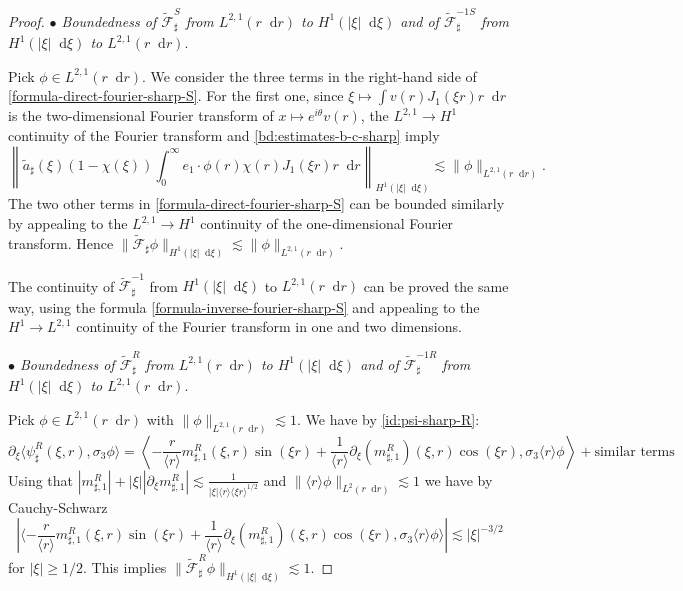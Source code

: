 \documentclass[11 pt]{amsart}
\theoremstyle{definition}
\theoremstyle{remark}
\numberwithin{equation}{section}
\newcommand{\dd}{\mathop{}\!\mathrm{d}}
\begin{document}
\begin{proof}
\smallskip


\noindent \textit{$\bullet$ Boundedness of $\widetilde{\mathcal F}_\sharp^S$ from $L^{2,1}(r\dd r)$ to $H^1(|\xi|\dd \xi)$ and of $\widetilde{\mathcal F}^{-1S}_\sharp$ from $H^1(|\xi|\dd \xi)$ to $L^{2,1}(r\dd r)$}.

Pick $\phi\in L^{2,1}(r\dd r)$. We consider the three terms in the right-hand side of \eqref{formula-direct-fourier-sharp-S}. For the first one, since $\xi \mapsto \int v(r)J_1(\xi r) r\dd r$ is the two-dimensional Fourier transform of $x\mapsto e^{i\theta}v(r)$, the $L^{2,1}\rightarrow H^1$ continuity of the Fourier transform and \eqref{bd:estimates-b-c-sharp} imply 
$$
\left\| \widetilde a_\sharp (\xi) (1- \chi(\xi)) \int_0^\infty e_1 \cdot \phi(r)\chi (r)  J_1(\xi r) r\dd r \right\|_{H^1(|\xi|\dd \xi)}\lesssim \| \phi \|_{L^{2,1}(r\dd r)}.
$$
The two other terms in \eqref{formula-direct-fourier-sharp-S} can be bounded similarly by appealing to the $L^{2,1}\rightarrow H^1$ continuity of the one-dimensional Fourier transform. Hence $\| \widetilde{\mathcal F}_\sharp \phi\|_{H^1(|\xi|\dd \xi)}\lesssim \| \phi \|_{L^{2,1}(r\dd r)}$.

The continuity of $\widetilde{\mathcal F}^{-1}_\sharp$ from $H^1(|\xi|\dd \xi)$ to $L^{2,1}(r\dd r)$ can be proved the same way, using the formula \eqref{formula-inverse-fourier-sharp-S} and appealing to the $H^1\to L^{2,1}$ continuity of the Fourier transform in one and two dimensions.

\smallskip \noindent \textit{$\bullet$ Boundedness of $\widetilde{\mathcal F}_\sharp^R$ from $L^{2,1}(r\dd r)$ to $H^1(|\xi|\dd \xi)$ and of $\widetilde{\mathcal F}^{-1R}_\sharp$ from $H^1(|\xi|\dd \xi)$ to $L^{2,1}(r\dd r)$}.

Pick $\phi\in L^{2,1}(r\dd r)$ with $\| \phi\|_{L^{2,1}(r\dd r)}\lesssim 1$. We have by \eqref{id:psi-sharp-R}:
$$
\partial_\xi \langle \psi^R_\sharp (\xi,r),\sigma_3 \phi \rangle = \left\langle -\frac{r}{\langle r\rangle}  m_{\sharp, 1}^R (\xi, r) \sin (\xi r)+\frac{1}{\langle r \rangle}\partial_\xi ( m_{\sharp, 1}^R) (\xi, r) \cos (\xi r) ,\sigma_3 \langle r \rangle \phi \right\rangle +\mbox{similar terms}
$$
Using that $| m_{\sharp, 1}^R|+|\xi||\partial_\xi m_{\sharp, 1}^R|\lesssim\frac{1}{|\xi| \langle r \rangle\langle \xi r \rangle^{1/2}}$ and $\| \langle r \rangle \phi\|_{L^2(r\dd r)}\lesssim 1$ we have by Cauchy-Schwarz
$$
\left| \langle -\frac{r}{\langle r\rangle}  m_{\sharp, 1}^R (\xi, r) \sin (\xi r)+\frac{1}{\langle r \rangle}\partial_\xi ( m_{\sharp, 1}^R) (\xi, r) \cos (\xi r) ,\sigma_3 \langle r \rangle \phi \rangle\right|\lesssim |\xi|^{-3/2}
$$
for $|\xi|\geq 1/2$. This implies $\| \widetilde{\mathcal F}_\sharp^R \phi \|_{H^1(|\xi|\dd \xi)}\lesssim 1$.


\end{proof}
\end{document}
